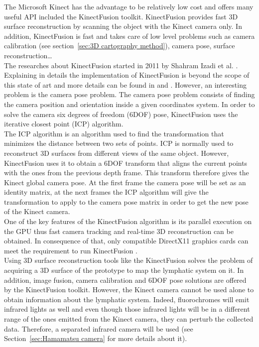 The Microsoft Kinect has the advantage to be relatively low cost and offers many useful API included the KinectFusion toolkit. KinectFusion provides fast 3D surface reconstruction by scanning the object with the Kinect camera only. In addition, KinectFusion is fast and takes care of low level problems such as camera calibration (see section~\ref{sec:3D cartography method}), camera pose, surface reconstruction\ldots \\

The researches about KinectFusion started in 2011 by Shahram Izadi et al. \cite{izadi_kinectfusion:_2011}. Explaining in details the implementation of KinectFusion is beyond the scope of this state of art and more details can be found in \cite{newcombe_kinectfusion:_2011} and \cite{izadi_kinectfusion:_2011}. However, an interesting problem is the camera pose problem. The camera pose problem consists of finding the camera position and orientation inside a given coordinates system. In order to solve the camera six degrees of freedom (6DOF) pose, KinectFusion uses the iterative closest point (ICP) algorithm.\\

The ICP algorithm is an algorithm used to find the transformation that minimizes the distance between two sets of points. ICP is normally used to reconstruct 3D surfaces from different views of the same object. However, KinectFusion uses it to obtain a 6DOF transform that aligns the current points with the ones from the previous depth frame. This transform therefore gives the Kinect global camera pose. At the first frame the camera pose will be set as an identity matrix, at the next frames the ICP algorithm will give the transformation to apply to the camera pose matrix in order to get the new pose of the Kinect camera.\\

One of the key features of the KinectFusion algorithm is its parallel execution \cite{izadi_kinectfusion:_2011} on the GPU thus fast camera tracking and real-time 3D reconstruction can be obtained. In consequence of that, only compatible DirectX11 graphics cards can meet the requirement to run KinectFusion \cite{kinect}.\\

Using 3D surface reconstruction tools like the KinectFusion solves the problem of acquiring a 3D surface of the prototype to map the lymphatic system on it.  In addition, image fusion, camera calibration and 6DOF pose solutions are offered by the KinectFusion toolkit. However, the Kinect camera cannot be used alone to obtain information about the lymphatic system. Indeed, fluorochromes will emit infrared lights as well and even though those infrared lights will be in a different range of the ones emitted from the Kinect camera, they can perturb the collected data. Therefore, a separated infrared camera will be used (see Section~\ref{sec:Hamamatsu camera} for more details about it).

